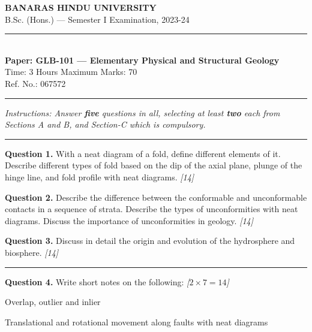\documentclass[11pt,a4paper]{article}
\newcommand{\pts}[1]{\hfill   \textit{[#1]}}
\begin{document}
\begin{center}
  {\large\bfseries BANARAS HINDU UNIVERSITY}\\[2pt]
  {\normalsize B.Sc. (Hons.) --- Semester I Examination, 2023-24}\\[6pt]
  \rule{0.8\linewidth}{0.5pt}\\[6pt]
  {\large\bfseries Paper: GLB-101 --- Elementary Physical and Structural Geology}\\[4pt]
  {\normalsize Time: 3 Hours \hfill Maximum Marks: 70}\\[2pt]
  {\small Ref. No.: 067572}
\end{center}
\rule{\linewidth}{0.4pt}
\smallskip



\noindent   \textit{Instructions: Answer   \textbf{five} questions in all, selecting at least   \textbf{two} each from Sections A and B, and Section-C which is compulsory.}
\bigskip

\bigskip


\rule{\linewidth}{0.4pt}\smallskip




\noindent   \textbf{Question 1.} With a neat diagram of a fold, define different elements of it. Describe different types of fold based on the dip of the axial plane, plunge of the hinge line, and fold profile with neat diagrams. \pts{14}

\medskip


\noindent   \textbf{Question 2.} Describe the difference between the conformable and unconformable contacts in a sequence of strata. Describe the types of unconformities with neat diagrams. Discuss the importance of unconformities in geology. \pts{14}

\medskip


\noindent   \textbf{Question 3.} Discuss in detail the origin and evolution of the hydrosphere and biosphere. \pts{14}

\bigskip


\rule{\linewidth}{0.4pt}\smallskip




\noindent   \textbf{Question 4.} Write short notes on the following: \pts{$2  \times 7 = 14$}

\begin{parts}
  \item Overlap, outlier and inlier
  \item Translational and rotational movement along faults with neat diagrams
\end{parts}
\end{document}

